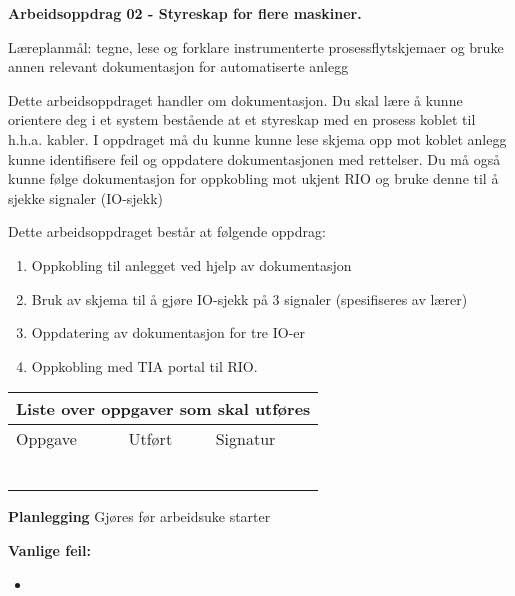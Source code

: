 
\noindent
{\bf Arbeidsoppdrag 02 - Styreskap for flere maskiner.}

\vskip 5pt
Læreplanmål:
tegne, lese og forklare instrumenterte prosessflytskjemaer og bruke annen relevant dokumentasjon for automatiserte anlegg

Dette arbeidsoppdraget handler om dokumentasjon. Du skal lære å kunne orientere deg i et system bestående at et styreskap med en prosess koblet til h.h.a. kabler. I oppdraget må du kunne kunne lese skjema opp mot koblet anlegg kunne identifisere feil og oppdatere dokumentasjonen med rettelser. Du må også kunne følge dokumentasjon for oppkobling mot ukjent RIO og bruke denne til å sjekke signaler (IO-sjekk)

Dette arbeidsoppdraget består at følgende oppdrag:
\begin{enumerate}
	\item Oppkobling til anlegget ved hjelp av dokumentasjon
	\item Bruk av skjema til å gjøre IO-sjekk på 3 signaler (spesifiseres av lærer)
	\item Oppdatering av dokumentasjon for tre IO-er
	\item Oppkobling med TIA portal til RIO. 
\end{enumerate}



\begin{center}
\begin{tabular}{ | m{8cm} | m{1cm}| m{2cm} | } 
\hline
\multicolumn{3}{|c|}{Liste over oppgaver som skal utføres} \\
	\hline
	Oppgave	& Utført & Signatur \\ 
	\hline
	\hline
	& & \\ 
	\hline
	& & \\ 
	\hline
	& & \\ 
	\hline
	& & \\ 
	\hline
	& & \\ 
	\hline
	& & \\ 
	\hline
\end{tabular}
\end{center}

\textbf{Planlegging}
Gjøres før arbeidsuke starter

\textbf{Vanlige feil:}
\begin{itemize}[noitemsep]
	\item 
\end{itemize}

